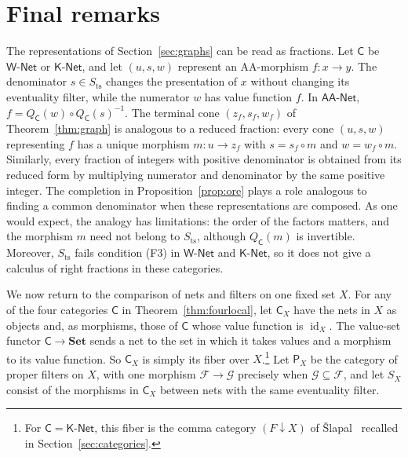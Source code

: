 \documentclass[11pt,a4paper]{article}
\theoremstyle{definition}
\theoremstyle{remark}
\newcommand{\Wpar}{\mathsf{W\text{-}Net}}
\newcommand{\Kpar}{\mathsf{K\text{-}Net}}
\newcommand{\NetAA}{\mathsf{AA\text{-}Net}}
\newcommand{\FF}{\mathcal F}
\newcommand{\GG}{\mathcal G}
\newcommand{\CC}{\mathsf C}
\newcommand{\id}{\operatorname{id}}
\newcommand{\Sts}{S_{\mathrm{ts}}}
\begin{document}
\section{Final remarks}\label{sec:final}
The representations of Section~\ref{sec:graphs} can be read as
fractions. Let \(\CC\) be
\(\Wpar\) or \(\Kpar\), and let \((u,s,w)\) represent an AA-morphism
\(f:x\to y\). The denominator \(s\in\Sts\) changes the presentation
of \(x\) without changing its eventuality filter, while the numerator
\(w\) has value function \(f\). In \(\NetAA\),
\(f=Q_{\CC}(w)\circ Q_{\CC}(s)^{-1}\). The terminal cone
\((z_f,s_f,w_f)\) of Theorem~\ref{thm:graph} is analogous to a reduced
fraction: every cone \((u,s,w)\) representing \(f\) has a unique
morphism \(m:u\to z_f\) with \(s=s_f\circ m\) and
\(w=w_f\circ m\). Similarly, every fraction of integers with positive
denominator is obtained from its reduced form by multiplying numerator
and denominator by the same positive integer. The
completion in Proposition~\ref{prop:ore} plays a role analogous to
finding a common denominator when these representations are composed.
As one would expect, the analogy has limitations: the order of the
factors matters, and the morphism \(m\) need not belong to \(\Sts\),
although \(Q_{\CC}(m)\) is invertible. Moreover, \(\Sts\)
fails condition (F3) in \(\Wpar\) and \(\Kpar\), so it does not give a
calculus of right fractions in these categories.

We now return to the comparison of nets and filters on one fixed
set \(X\). For any of the four categories \(\CC\) in
Theorem~\ref{thm:fourlocal}, let \(\CC_X\) have the nets in \(X\) as
objects and, as morphisms, those of \(\CC\) whose value function is \(\id_X\).
The value-set functor \(\CC\to\mathbf{Set}\) sends a net to the
set in which it takes values and a morphism to its value function.
So \(\CC_X\) is simply its fiber over \(X\).\footnote{For
\(\CC=\Kpar\), this fiber is the comma category \((F\downarrow X)\)
of \v{S}lapal~\cite[Section 2]{Slapal2016} recalled in
Section~\ref{sec:categories}.}
Let \(\mathsf P_X\) be the category of proper filters on \(X\), with
one morphism \(\FF\to\GG\) precisely when \(\GG\subseteq\FF\), and let
\(S_X\) consist of the morphisms in \(\CC_X\) between nets with the
same eventuality filter.
\end{document}
